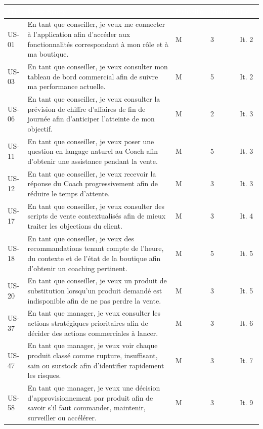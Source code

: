 \begin{longtable}{|P{1.3cm}|P{7.8cm}|P{1.5cm}|P{1.2cm}|P{1.2cm}|}
\hline
{}
\textcolor{white}{\textbf{ID}} &
\textcolor{white}{\textbf{User Story}} &
\textcolor{white}{\textbf{Priorité}} &
\textcolor{white}{\textbf{Points}} &
\textcolor{white}{\textbf{Itér.}} \\
\hline
\endhead
\hline
\endfoot
\hline
\endlastfoot
US-01 & En tant que conseiller, je veux me connecter à l'application afin d'accéder aux fonctionnalités correspondant à mon rôle et à ma boutique. & M & 3 & It. 2 \\
\hline
US-03 & En tant que conseiller, je veux consulter mon tableau de bord commercial afin de suivre ma performance actuelle. & M & 5 & It. 2 \\
\hline
US-06 & En tant que conseiller, je veux consulter la prévision de chiffre d'affaires de fin de journée afin d'anticiper l'atteinte de mon objectif. & M & 2 & It. 3 \\
\hline
US-11 & En tant que conseiller, je veux poser une question en langage naturel au Coach afin d'obtenir une assistance pendant la vente. & M & 5 & It. 3 \\
\hline
US-12 & En tant que conseiller, je veux recevoir la réponse du Coach progressivement afin de réduire le temps d'attente. & M & 3 & It. 3 \\
\hline
US-17 & En tant que conseiller, je veux consulter des scripts de vente contextualisés afin de mieux traiter les objections du client. & M & 3 & It. 4 \\
\hline
US-18 & En tant que conseiller, je veux des recommandations tenant compte de l'heure, du contexte et de l'état de la boutique afin d'obtenir un coaching pertinent. & M & 5 & It. 5 \\
\hline
US-20 & En tant que conseiller, je veux un produit de substitution lorsqu'un produit demandé est indisponible afin de ne pas perdre la vente. & M & 3 & It. 5 \\
\hline
US-37 & En tant que manager, je veux consulter les actions stratégiques prioritaires afin de décider des actions commerciales à lancer. & M & 3 & It. 6 \\
\hline
US-47 & En tant que manager, je veux voir chaque produit classé comme rupture, insuffisant, sain ou surstock afin d'identifier rapidement les risques. & M & 3 & It. 7 \\
\hline
US-58 & En tant que manager, je veux une décision d'approvisionnement par produit afin de savoir s'il faut commander, maintenir, surveiller ou accélérer. & M & 3 & It. 9 \\

\end{longtable}
